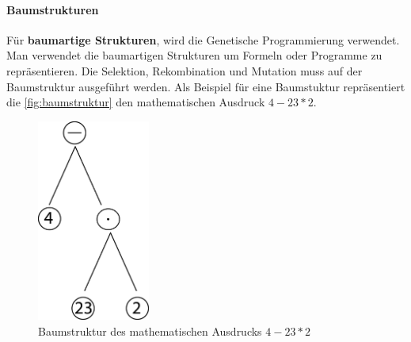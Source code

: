 \paragraph{Baumstrukturen}
F{\"u}r \textbf{baumartige Strukturen}, wird die Genetische Programmierung verwendet. 
Man verwendet die baumartigen Strukturen um Formeln oder Programme zu repr{\"a}sentieren. 
Die Selektion, Rekombination und Mutation muss auf der Baumstruktur ausgef{\"u}hrt werden.
Als Beispiel f{\"u}r eine Baumstuktur repr{\"a}sentiert die \autoref{fig:baumstruktur} den mathematischen Ausdruck $4 - 23 * 2$.

\begin{figure}
	\centering
    \includegraphics[width=0.33\textwidth]{pics/grundlage/baumstruktur.png}
    \caption{Baumstruktur des mathematischen Ausdrucks $4 - 23 * 2$}
    \label{fig:baumstruktur}
\end{figure}













